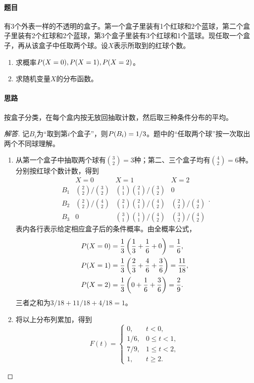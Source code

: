 \paragraph{题目}
有3个外表一样的不透明的盒子。第一个盒子里装有1个红球和2个蓝球，第二个盒子里装有2个红球和2个蓝球，第3个盒子里装有3个红球和1个蓝球。现任取一个盒子，再从该盒子中任取两个球。设$X$表示所取到的红球个数。
\begin{enumerate}
\item 求概率$\P(X=0),\P(X=1),\P(X=2)$。
\item 求随机变量$X$的分布函数。
\end{enumerate}
\paragraph{思路}按盒子分类，在每个盒内按无放回抽取计数，然后取三种条件分布的平均。
\begin{proof}[解答]
记$B_i$为“取到第$i$个盒子”，则$\P(B_i)=1/3$。题中的“任取两个球”按一次取出两个不同球理解。
\begin{enumerate}
\item 从第一个盒子中抽取两个球有$\binom32=3$种；第二、三个盒子均有$\binom42=6$种。分别按红球个数计数，得到
\[
\begin{array}{c|ccc}
&X=0&X=1&X=2\\\hline
B_1&\binom22/\binom32&\binom11\binom21/\binom32&0\\[0.3em]
B_2&\binom22/\binom42&\binom21\binom21/\binom42&\binom22/\binom42\\[0.3em]
B_3&0&\binom31\binom11/\binom42&\binom32/\binom42
\end{array}.
\]
表内各行表示给定相应盒子后的条件概率。由全概率公式，
\begin{align*}
\P(X=0)&=\frac13\left(\frac13+\frac16+0\right)=\frac16,\\
\P(X=1)&=\frac13\left(\frac23+\frac46+\frac36\right)=\frac{11}{18},\\
\P(X=2)&=\frac13\left(0+\frac16+\frac36\right)=\frac29.
\end{align*}
三者之和为$3/18+11/18+4/18=1$。
\item 将以上分布列累加，得到
\[
F(t)=\begin{cases}
0,&t<0,\\
1/6,&0\leq t<1,\\
7/9,&1\leq t<2,\\
1,&t\geq2.
\end{cases}
\]
\end{enumerate}
\end{proof}
